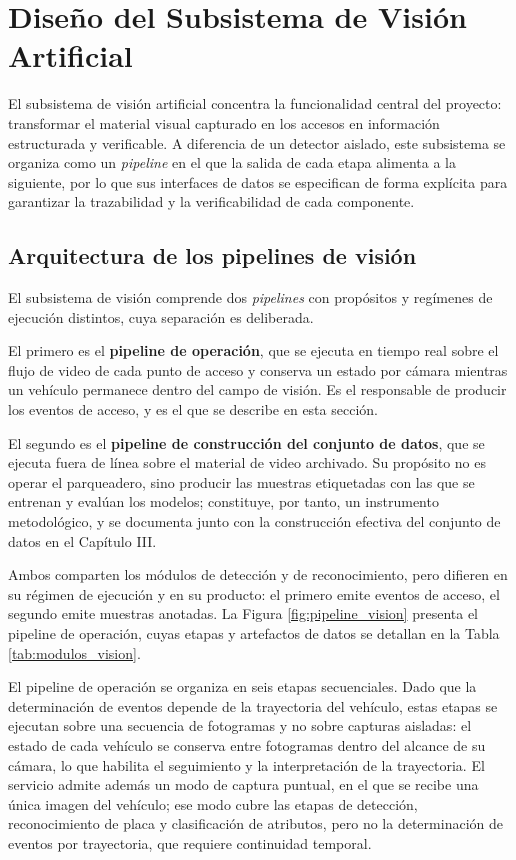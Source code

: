 \section{Diseño del Subsistema de Visión Artificial}

El subsistema de visión artificial concentra la funcionalidad central del
proyecto: transformar el material visual capturado en los accesos en información
estructurada y verificable. A diferencia de un detector aislado, este subsistema
se organiza como un \textit{pipeline} en el que la salida de cada etapa alimenta
a la siguiente, por lo que sus interfaces de datos se especifican de forma
explícita para garantizar la trazabilidad y la verificabilidad de cada
componente.

\subsection{Arquitectura de los pipelines de visión}

El subsistema de visión comprende dos \textit{pipelines} con propósitos y
regímenes de ejecución distintos, cuya separación es deliberada.

El primero es el \textbf{pipeline de operación}, que se ejecuta en tiempo real
sobre el flujo de video de cada punto de acceso y conserva un estado por cámara
mientras un vehículo permanece dentro del campo de visión. Es el responsable de
producir los eventos de acceso, y es el que se describe en esta sección.

El segundo es el \textbf{pipeline de construcción del conjunto de datos}, que se
ejecuta fuera de línea sobre el material de video archivado. Su propósito no es
operar el parqueadero, sino producir las muestras etiquetadas con las que se
entrenan y evalúan los modelos; constituye, por tanto, un instrumento
metodológico, y se documenta junto con la construcción efectiva del conjunto de
datos en el Capítulo III.

Ambos comparten los módulos de detección y de reconocimiento, pero difieren en su
régimen de ejecución y en su producto: el primero emite eventos de acceso, el
segundo emite muestras anotadas. La Figura \ref{fig:pipeline_vision} presenta el
pipeline de operación, cuyas etapas y artefactos de datos se detallan en la Tabla
\ref{tab:modulos_vision}.

El pipeline de operación se organiza en seis etapas secuenciales. Dado que la
determinación de eventos depende de la trayectoria del vehículo, estas etapas se
ejecutan sobre una secuencia de fotogramas y no sobre capturas aisladas: el
estado de cada vehículo se conserva entre fotogramas dentro del alcance de su
cámara, lo que habilita el seguimiento y la interpretación de la trayectoria. El
servicio admite además un modo de captura puntual, en el que se recibe una única
imagen del vehículo; ese modo cubre las etapas de detección, reconocimiento de
placa y clasificación de atributos, pero no la determinación de eventos por
trayectoria, que requiere continuidad temporal.


